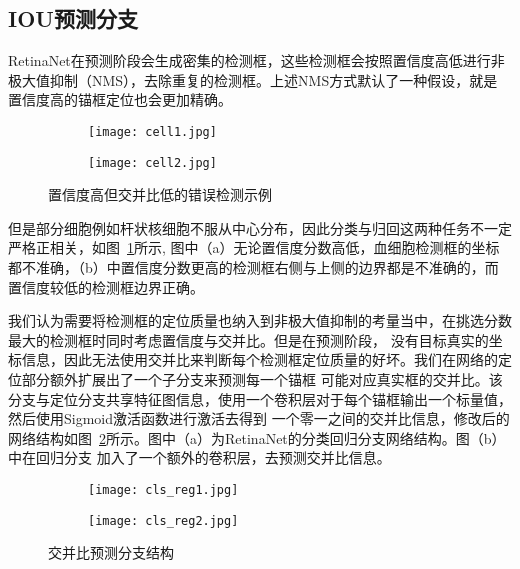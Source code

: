 \subsection{IOU预测分支}
RetinaNet在预测阶段会生成密集的检测框，这些检测框会按照置信度高低进行非极大值抑制（NMS），去除重复的检测框。上述NMS方式默认了一种假设，就是
置信度高的锚框定位也会更加精确。
\begin{figure}[htbp]
	\centering
  \begin{subfigure}{0.35\linewidth}
    \centering
    \texttt{[image: cell1.jpg]}
    \caption{}
  \end{subfigure}
	\centering
	\begin{subfigure}{0.35\linewidth}
		\centering
		\texttt{[image: cell2.jpg]}
    \caption{}
	\end{subfigure}
  \caption{置信度高但交并比低的错误检测示例}
	\label{fig:detect_err}
\end{figure}
但是部分细胞例如杆状核细胞不服从中心分布，因此分类与归回这两种任务不一定严格正相关\cite{he2019bounding}，如图~\ref{fig:detect_err}所示,
图中（a）无论置信度分数高低，血细胞检测框的坐标都不准确，（b）中置信度分数更高的检测框右侧与上侧的边界都是不准确的，而置信度较低的检测框边界正确。


我们认为需要将检测框的定位质量也纳入到非极大值抑制的考量当中，在挑选分数最大的检测框时同时考虑置信度与交并比。但是在预测阶段，
没有目标真实的坐标信息，因此无法使用交并比来判断每个检测框定位质量的好坏。我们在网络的定位部分额外扩展出了一个子分支来预测每一个锚框
可能对应真实框的交并比。该分支与定位分支共享特征图信息，使用一个卷积层对于每个锚框输出一个标量值，然后使用Sigmoid激活函数进行激活去得到
一个零一之间的交并比信息，修改后的网络结构如图~\ref{fig:cls_reg}所示。图中（a）为RetinaNet的分类回归分支网络结构。图（b）中在回归分支
加入了一个额外的卷积层，去预测交并比信息。
\begin{figure}[htbp]
  \centering
	\begin{subfigure}{0.45\linewidth}
		\centering
		\texttt{[image: cls\_reg1.jpg]}
    \caption{}
	\end{subfigure}
  \centering
	\begin{subfigure}{0.45\linewidth}
		\centering
		\texttt{[image: cls\_reg2.jpg]}
    \caption{}
	\end{subfigure}
  \caption{交并比预测分支结构}
	\label{fig:cls_reg}
\end{figure}

